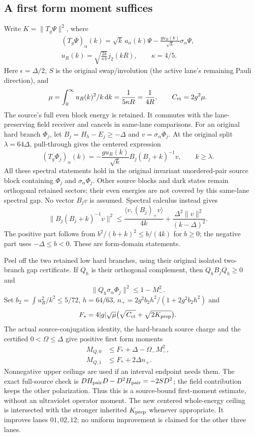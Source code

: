 \documentclass[10pt,twocolumn,letterpaper]{article}
\newcommand{\dd}{\mathrm{d}}
\begin{document}
\subsection{A first form moment suffices}
Write $K=\|T_g\Psi\|^2$, where
\[
 \begin{gathered}
 (T_g\Psi)_\alpha(k)=\sqrt{k}\,a_\alpha(k)\Psi
       -\frac{g u_R(k)}{\sqrt{k}}\sigma_\alpha\Psi,\\
 u_R(k)=\sqrt{\frac{2k}{\kappa\pi}}j_2(kR),\qquad\kappa=4/5.
 \end{gathered}
\]
Here $\epsilon=\Delta/2$, $S$ is the original swap/involution (the active
lane's remaining Pauli direction), and
\[
 \mu=\int_0^\infty u_R(k)^2/k\,\dd k
       =\frac{1}{5\kappa R}=\frac{1}{4R},\qquad
 C_{\rm ct}=2g^2\mu.
\]
The source's full even block energy is retained. It commutes with the
lane-preserving field receiver and cancels in same-lane comparisons.
For an original hard branch $\Phi_j$, let $B_j=H_h-E_j\ge-\Delta$ and
$v=\sigma_\alpha\Phi_j$.  At the original split $\lambda=64\Delta$,
pull-through gives the centered expression
\[
 (T_g\Phi_j)_\alpha(k)
 =-\frac{g u_R(k)}{\sqrt{k}}B_j(B_j+k)^{-1}v,
 \qquad k\ge\lambda.
\]
All these spectral statements hold in the original invariant unordered-pair
source block containing $\Phi_j$ and $\sigma_\alpha\Phi_j$. Other source
blocks and dark states remain orthogonal retained sectors; their even
energies are not covered by this same-lane spectral gap.
No vector $B_jv$ is assumed.  Spectral calculus instead gives
\[
 \|B_j(B_j+k)^{-1}v\|^2
 \le\frac{\langle v,(B_j)_+v\rangle}{4k}
       +\frac{\Delta^2\|v\|^2}{(k-\Delta)^2}.
\]
The positive part follows from $b^2/(b+k)^2\le b/(4k)$ for $b\ge0$;
the negative part uses $-\Delta\le b<0$.  These are form-domain statements.

Peel off the two retained low hard branches, using their original isolated
two-branch gap certificate.  If $Q_h$ is their orthogonal complement, then
$Q_h B_jQ_h\ge0$ and
\[
 \|Q_h\sigma_\alpha\Phi_j\|^2\le1-M_-^2.
\]
Set $b_2=\int u_R^2/k^2\le5/72$, $h=64/63$,
$n_+={2g^2b_2h^2}/{(1+2g^2b_2h^2)}$ and
\[
 F_*=4|g|\sqrt{\mu}\bigl(\sqrt{C_{\rm ct}}+\sqrt{2K_{\rm prep}}\bigr).
\]
The actual source-conjugation identity, the hard-branch source charge and
the certified $0<\Omega\le\Delta$ give positive first form moments
\[
 \begin{split}
 M_{Q,0}&\le F_*+\Delta-\Omega_-M_-^2,\\
 M_{Q,1}&\le F_*+2\Delta n_+.
 \end{split}
\]
Nonnegative upper ceilings are used if an interval endpoint needs them.
The exact full-source check is
$DH_{\rm pair}D-D^2H_{\rm pair}=-2SD^2$;
the field contribution keeps the other polarization.  Thus this is a
source-bound first-moment estimate, without an ultraviolet operator moment.
The new centered whole-energy ceiling is intersected with the stronger
inherited $K_{\rm prep}$ whenever appropriate.  It improves lanes
$01,02,12$; no uniform improvement is claimed for the other three lanes.
\end{document}
